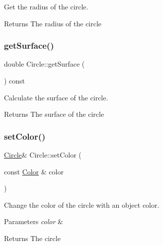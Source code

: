 Get the radius of the circle. 

\begin{DoxyReturn}{Returns}
The radius of the circle 
\end{DoxyReturn}
\mbox{\label{classCircle_a1c83fc4e8df86bc91239462210f3b2d3}} 
\subsubsection{\texorpdfstring{get\+Surface()}{getSurface()}}
{\footnotesize\ttfamily double Circle\+::get\+Surface (\begin{DoxyParamCaption}{ }\end{DoxyParamCaption}) const}



Calculate the surface of the circle. 

\begin{DoxyReturn}{Returns}
The surface of the circle 
\end{DoxyReturn}
\mbox{\label{classCircle_a7e0039e4c56e5f4c5e26aa56c72a17f5}} 
\subsubsection{\texorpdfstring{set\+Color()}{setColor()}\hspace{0.1cm}{\footnotesize\ttfamily [1/2]}}
{\footnotesize\ttfamily \hyperlink{classCircle}{Circle}\& Circle\+::set\+Color (\begin{DoxyParamCaption}\item[{const \hyperlink{classColor}{Color} \&}]{color }\end{DoxyParamCaption})}



Change the color of the circle with an object color. 


\begin{DoxyParams}{Parameters}
{\em color} & \\
\hline
\end{DoxyParams}
\begin{DoxyReturn}{Returns}
The circle 
\end{DoxyReturn}
\mbox{\label{classCircle_aeff5f4c8614715508b9224fbf9b8a62d}} 
